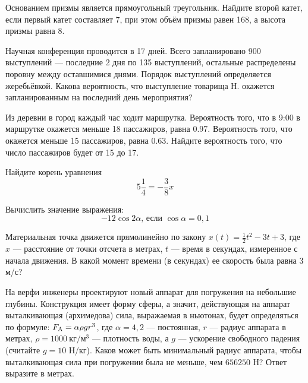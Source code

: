 \documentclass[twocolumn]{article}
\begin{document}
\begin{taskBN}{2}
Основанием призмы является  прямоугольный треугольник. Найдите второй катет, если первый катет составляет 7, при этом объём призмы равен 168, а высота призмы равна 8. 
\end{taskBN}

\begin{taskBN}{3}
Научная конференция проводится в 17 дней. Всего запланировано 900 выступлений — последние 2 дня по 135 выступлений, остальные распределены поровну между оставшимися днями. Порядок выступлений определяется жеребьёвкой. Какова вероятность, что выступление товарища Н. окажется запланированным на последний день мероприятия?
\end{taskBN}

\begin{taskBN}{4}
Из деревни в город каждый час ходит маршрутка. Вероятность того, что в 9:00 в маршрутке окажется меньше 18 пассажиров, равна 0.97. Вероятность того, что окажется меньше 15 пассажиров, равна 0.63. Найдите вероятность того, что число пассажиров будет от 15 до 17.
\end{taskBN}

\begin{taskBN}{5}
Найдите корень уравнения $${5}\frac{1}{4}=-\frac{3}{8}x$$
\end{taskBN}

\begin{taskBN}{6}
Вычислить значение выражения: $$ {-12}\cos2\alpha\mbox{, если }\cos\alpha = {0,1}$$
\end{taskBN}

\begin{taskBN}{7}
Материальная точка движется прямолинейно по закону $x(t)=\frac{1}{2}t^{2}-3t+3$, где $x$ — расстояние от точки отсчета в метрах, $t$ — время в секундах, измеренное с начала движения. В какой момент времени (в секундах) ее скорость была равна $3$ м/с?
\end{taskBN}

\begin{taskBN}{8}
На верфи инженеры проектируют новый аппарат для погружения на небольшие глубины. Конструкция имеет форму сферы, а значит, действующая на аппарат выталкивающая (архимедова) сила, выражаемая в ньютонах, будет определяться по формуле:  $F_{\rm{A}}  = \alpha \rho gr^3$, где $\alpha  = 4,2$ — постоянная, $r$ — радиус аппарата в метрах, $\rho  = 1000~\mbox{кг}/\mbox{м}^3$ — плотность воды, а $g$ — ускорение свободного падения (считайте $g = 10$ Н/кг). Каков может быть минимальный радиус аппарата, чтобы выталкивающая сила при погружении была не меньше, чем $656250$ Н? Ответ выразите в метрах.
\end{taskBN}
\end{document}
